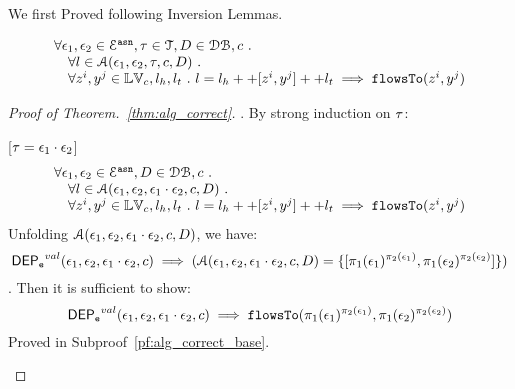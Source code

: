 \documentclass[a4paper,11pt]{article}
\begin{document}
We first Proved following Inversion Lemmas.

\clearpage

\begin{thm}[Correctness]
\label{thm:alg_correct}
\[
\begin{array}{l}
  \forall \mathtt{\epsilon}_1, \mathtt{\epsilon}_2 \in \mathcal{E}^{\mathtt{{asn}}}, \mathtt{\tau} \in \mathcal{T}, D \in \mathcal{DB} , c ~.~
  \\ \quad 
   \forall l \in \mathcal{A}(\mathtt{\epsilon}_1, \mathtt{\epsilon}_2, \mathtt{\tau}, c, D) ~.~
   \\ \quad 
   \forall z^i, y^j \in \mathbb{LV}_c, l_h, l_t ~.~ 
   l = l_h ++ [z^i, y^j] ++ l_t 
   \implies \mathtt{flowsTo}(z^i, y^j)
\end{array}
\]
\end{thm}

\begin{proof}[Proof of Theorem.~\ref{thm:alg_correct}].
By strong induction on $\mathtt{\tau}$:
\begin{case}
\label{case:alg_correct_base}
[$\mathtt{\tau} = \mathtt{\epsilon}_1 \cdot \mathtt{\epsilon}_2$]
\[
\begin{array}{l}
  \forall \mathtt{\epsilon}_1, \mathtt{\epsilon}_2 \in \mathcal{E}^{\mathtt{{asn}}}, D \in \mathcal{DB} , c ~.~
  \\ \quad 
   \forall l \in \mathcal{A}( \mathtt{\epsilon}_1, \mathtt{\epsilon}_2,  \mathtt{\epsilon}_1 \cdot \mathtt{\epsilon}_2, c, D) ~.~
   \\ \quad 
   \forall z^i, y^j \in \mathbb{LV}_c, l_h, l_t ~.~ 
   l = l_h ++ [z^i, y^j] ++ l_t 
   \implies \mathtt{flowsTo}(z^i, y^j)
\end{array}
\]
%
Unfolding $\mathcal{A}(\mathtt{\epsilon}_1, \mathtt{\epsilon}_2,\mathtt{\epsilon}_1 \cdot \mathtt{\epsilon}_2, c, D)$, we have:
%
$$
\mathsf{DEP_{\mathtt{e}}}^{val}(\mathtt{\epsilon}_1, \mathtt{\epsilon}_2, \mathtt{\epsilon}_1 \cdot \mathtt{\epsilon}_2, c) \implies (\mathcal{A}( \mathtt{\epsilon}_1, \mathtt{\epsilon}_2,  \mathtt{\epsilon}_1 \cdot \mathtt{\epsilon}_2, c, D) = \{[\pi_1(\mathtt{\epsilon}_1)^{\pi_2(\mathtt{\epsilon}_1)}, \pi_1(\mathtt{\epsilon}_2)^{\pi_2(\mathtt{\epsilon}_2)}]\} )
$$.
%
Then it is sufficient to show:
%
\[
  \mathsf{DEP_{\mathtt{e}}}^{val}(\mathtt{\epsilon}_1, \mathtt{\epsilon}_2, \mathtt{\epsilon}_1 \cdot \mathtt{\epsilon}_2, c) \implies \mathtt{flowsTo}(\pi_1(\mathtt{\epsilon}_1)^{\pi_2(\mathtt{\epsilon}_1)}, \pi_1(\mathtt{\epsilon}_2)^{\pi_2(\mathtt{\epsilon}_2)})
\]
%
% 
Proved in Subproof~\ref{pf:alg_correct_base}.


\end{case}
\end{proof}
\end{document}
